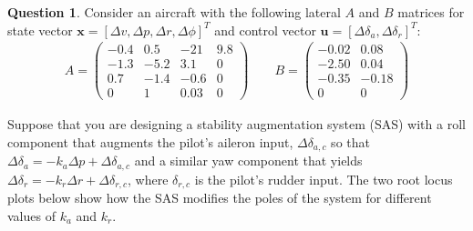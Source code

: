 \documentclass{article}
\theoremstyle{definition}
\newtheorem{question}{Question}
\begin{document}
\begin{question}
    Consider an aircraft with the following lateral $A$ and $B$ matrices for state vector $\mathbf{x} = [\Delta v,\Delta p,\Delta r,\Delta \phi]^T$ and control vector $\mathbf{u} = [\Delta \delta_a,\Delta \delta_r]^T$:
\begin{align*}
    A = 
    \begin{pmatrix}
        -0.4 & 0.5 & -21 & 9.8 \\
        -1.3 & -5.2 & 3.1 & 0 \\
        0.7 & -1.4 & -0.6 & 0 \\
        0 & 1 & 0.03 & 0
    \end{pmatrix} \quad \quad
    B = 
    \begin{pmatrix}
        -0.02 & 0.08 \\
        -2.50 & 0.04 \\
        -0.35 & -0.18 \\
        0 & 0
    \end{pmatrix}
\end{align*}

Suppose that you are designing a stability augmentation system (SAS) with a roll component that augments the pilot's aileron input, $\Delta \delta_{a, c}$ so that $\Delta \delta_a = -k_a \Delta p + \Delta \delta_{a,c}$ and a similar yaw component that yields $\Delta \delta_r = -k_r \Delta r + \Delta \delta_{r,c}$, where $\delta_{r,c}$ is the pilot's rudder input. The two root locus plots below show how the SAS modifies the poles of the system for different values of $k_a$ and $k_r$.


\end{question}
\end{document}
